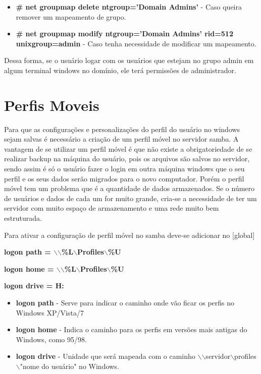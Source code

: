 \begin{itemize}
	\item \textbf{\# net groupmap delete ntgroup='Domain Admins'} - Caso queira remover um mapeamento de grupo.
	\item \textbf{\# net groupmap modify ntgroup='Domain Admins' rid=512 unixgroup=admin} - Caso tenha necessidade de modificar um mapeamento.
\end{itemize}

Dessa forma, se o usuário logar com os usuários que estejam no grupo admin em algum terminal windows no domínio, ele terá permissões de administrador.

\section{Perfis Moveis}

Para que as configurações e personalizações do perfil do usuário no windows sejam salvas é necessário a criação de um perfil móvel no servidor samba. 
A vantagem de se utilizar um perfil móvel é que não existe a obrigatoriedade de se realizar backup na máquina do usuário, pois os arquivos são salvos no servidor, sendo assim é só o usuário fazer o login em outra máquina windows que o seu perfil e os seus dados serão migrados para o novo computador. Porém o perfil móvel tem um problema que é a quantidade de dados armazenados. Se o número de usuários e dados de cada um for muito grande, cria-se a necessidade de ter um servidor com muito espaço de armazenamento e uma rede muito bem estruturada. 

Para ativar a configuração de perfil móvel no samba deve-se adicionar no [global] 

\textbf	{logon path = $\backslash$$\backslash$\%L$\backslash$Profiles$\backslash$\%U}

\textbf {logon home = $\backslash$$\backslash$\%L$\backslash$Profiles$\backslash$\%U}

\textbf	{logon drive = H:}

\begin{itemize}
	\item \textbf{logon path} - Serve para indicar o caminho onde vão ficar os perfis no Windows XP/Vista/7 
	\item \textbf{logon home} - Indica o caminho para os perfis em versões mais antigas do Windows, como 95/98.
	\item \textbf{logon drive} - Unidade que será mapeada com o caminho $\backslash$$\backslash$servidor$\backslash$profiles$\backslash$"nome do usuário" no Windows.
\end{itemize}

